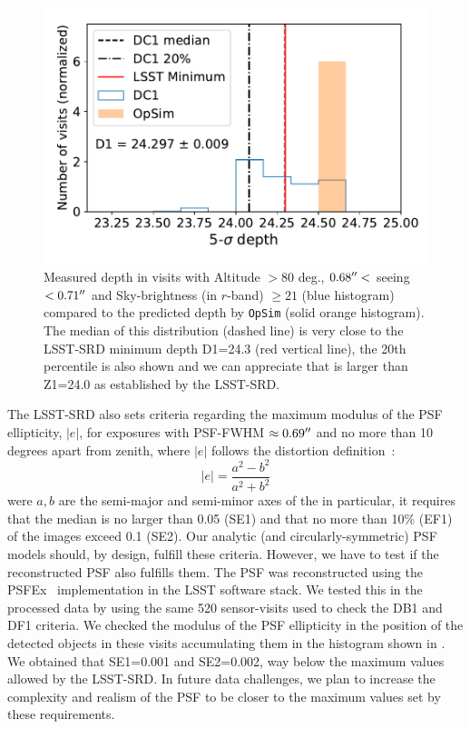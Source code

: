 \documentclass[twocolumn]{aastex62}
\begin{document}
\begin{figure}
\centering
\includegraphics[width=0.9\columnwidth]{m5_goals}
\caption{Measured depth in visits with Altitude $>80$ deg., $0.68 \mbox{$^{\prime\prime}$} <$ seeing $ < 0.71 \mbox{$^{\prime\prime}$}$ and Sky-brightness (in $r$-band) $\geq 21$ (blue histogram) compared to the predicted depth by \texttt{OpSim} (solid orange histogram). The median of this distribution (dashed line) is very close to the LSST-SRD minimum depth D1=24.3 (red vertical line), the 20th percentile is also shown and we can appreciate that is larger than Z1=24.0 as established by the LSST-SRD.}
\label{fig:DF1_checks}
\end{figure}

The LSST-SRD also sets criteria regarding the maximum modulus of the PSF ellipticity, $|e|$,
for exposures with PSF-FWHM $\approx 0.69\mbox{$^{\prime\prime}$}$ and no more than 10 degrees apart from zenith, where $|e|$ follows the distortion definition~\citep{1991ApJ...380....1M}:
\begin{equation}
|e| = \frac{a^{2} - b^{2}}{a^{2}+b^{2}}
\end{equation}
were $a, b$ are the semi-major and semi-minor axes of the 
in particular, it requires that the median is no larger than 0.05 (SE1) and that no more than 10\% (EF1) of the images exceed 0.1 (SE2). Our analytic (and circularly-symmetric) PSF models should, by design, fulfill these criteria. However, we have to test if the reconstructed PSF also fulfills them. The PSF was reconstructed using the PSFEx~\citep{2011ASPC..442..435B} implementation in the LSST software stack. We tested this in the processed data by using the same 520 sensor-visits used to check the DB1 and DF1 criteria. We checked the modulus of the PSF ellipticity in the position of the detected objects in these visits accumulating them in the histogram shown in . We obtained that SE1=0.001 and SE2=0.002, way below the maximum values allowed by the LSST-SRD. In future data challenges, we plan to increase the complexity and realism of the PSF to be closer to the maximum values set by these requirements.
\end{document}
